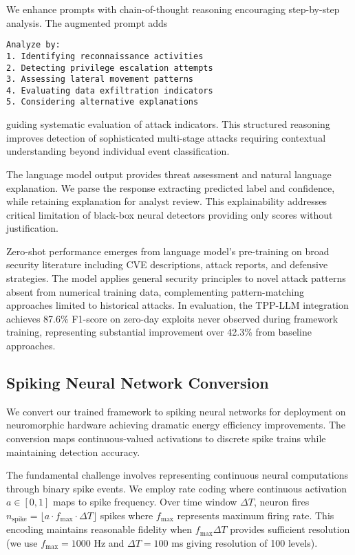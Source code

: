 \documentclass[10pt,journal,compsoc]{IEEEtran}
\begin{document}
We enhance prompts with chain-of-thought reasoning encouraging step-by-step analysis. The augmented prompt adds
\begin{verbatim}
Analyze by:
1. Identifying reconnaissance activities
2. Detecting privilege escalation attempts  
3. Assessing lateral movement patterns
4. Evaluating data exfiltration indicators
5. Considering alternative explanations
\end{verbatim}
guiding systematic evaluation of attack indicators. This structured reasoning improves detection of sophisticated multi-stage attacks requiring contextual understanding beyond individual event classification.

The language model output provides threat assessment and natural language explanation. We parse the response extracting predicted label and confidence, while retaining explanation for analyst review. This explainability addresses critical limitation of black-box neural detectors providing only scores without justification.

Zero-shot performance emerges from language model's pre-training on broad security literature including CVE descriptions, attack reports, and defensive strategies. The model applies general security principles to novel attack patterns absent from numerical training data, complementing pattern-matching approaches limited to historical attacks. In evaluation, the TPP-LLM integration achieves 87.6\% F1-score on zero-day exploits never observed during framework training, representing substantial improvement over 42.3\% from baseline approaches.

\subsection{Spiking Neural Network Conversion}

We convert our trained framework to spiking neural networks for deployment on neuromorphic hardware achieving dramatic energy efficiency improvements. The conversion maps continuous-valued activations to discrete spike trains while maintaining detection accuracy.

The fundamental challenge involves representing continuous neural computations through binary spike events. We employ rate coding where continuous activation $a \in [0, 1]$ maps to spike frequency. Over time window $\Delta T$, neuron fires $n_{\text{spike}} = \lfloor a \cdot f_{\max} \cdot \Delta T \rfloor$ spikes where $f_{\max}$ represents maximum firing rate. This encoding maintains reasonable fidelity when $f_{\max} \Delta T$ provides sufficient resolution (we use $f_{\max} = 1000$ Hz and $\Delta T = 100$ ms giving resolution of 100 levels).
\end{document}
